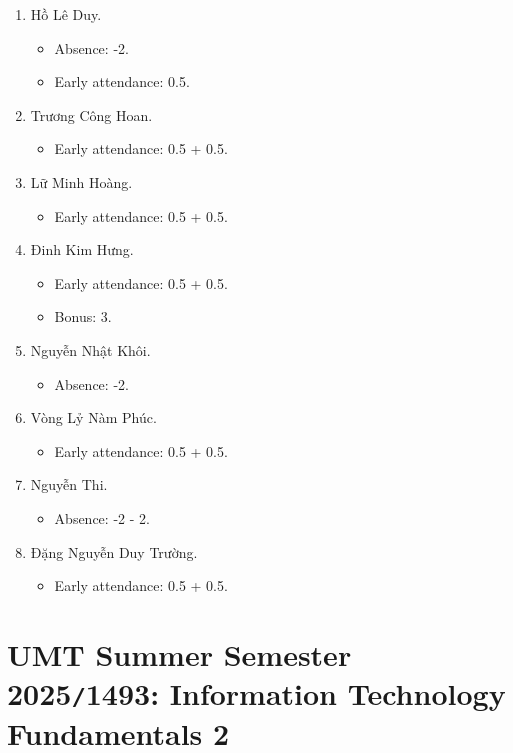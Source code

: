 \documentclass{article}
\begin{document}
\begin{enumerate}
	\item {\sc Hồ Lê Duy.}
	\begin{itemize}
		\item Absence: -2.
		\item Early attendance: 0.5.
	\end{itemize}
	\item {\sc Trương Công Hoan.}
	\begin{itemize}
		\item Early attendance: 0.5 + 0.5.
	\end{itemize}
	\item {\sc Lữ Minh Hoàng.}
	\begin{itemize}
		\item Early attendance: 0.5 + 0.5.
	\end{itemize}
	\item {\sc Đinh Kim Hưng.}
	\begin{itemize}
		\item Early attendance: 0.5 + 0.5.
		\item Bonus: 3.
	\end{itemize}
	\item {\sc Nguyễn Nhật Khôi.}
	\begin{itemize}
		\item Absence: -2.
	\end{itemize}
	\item {\sc Vòng Lỷ Nàm Phúc.}
	\begin{itemize}
		\item Early attendance: 0.5 + 0.5.
	\end{itemize}
	\item {\sc Nguyễn Thi.}
	\begin{itemize}
		\item Absence: -2 - 2.
	\end{itemize}
	\item {\sc Đặng Nguyễn Duy Trường.}
	\begin{itemize}
		\item Early attendance: 0.5 + 0.5.
	\end{itemize}
\end{enumerate}


\section{UMT Summer Semester 2025{\tt/}1493: Information Technology Fundamentals 2}
\end{document}
